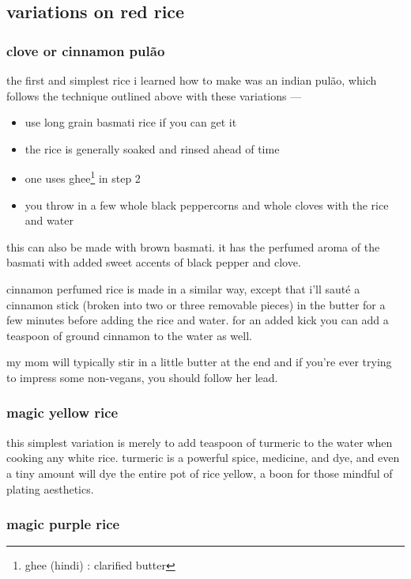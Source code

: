 \subsection{variations on red rice}

\subsubsection{clove or cinnamon pul\~{a}o}

the first and simplest rice i learned how to make was an indian
pul\~{a}o, which follows the technique outlined above with these
variations ---
\begin{itemize}
  \item use long grain basmati rice if you can get it

  \item the rice is generally soaked and rinsed ahead of time

  \item one uses ghee\footnote{ghee (hindi) : clarified butter} in
  step 2
  
  \item you throw in a few whole black peppercorns and whole cloves
  with the rice and water
\end{itemize}

this can also be made with brown basmati. it has the perfumed aroma of the basmati with added sweet accents of black pepper and clove.

cinnamon perfumed rice is made in a similar way, except that i'll
saut\'e a cinnamon stick (broken into two or three removable pieces)
in the butter for a few minutes before adding the rice and water. for
an added kick you can add a \onehalf teaspoon of ground cinnamon to the
water as well.

my mom will typically stir in a little butter at the end and if you're
ever trying to impress some non-vegans, you should follow her lead.

\subsubsection{magic yellow rice}

this simplest variation is merely to add \onehalf teaspoon of turmeric to
the water when cooking any white rice. turmeric is a powerful spice,
medicine, and dye, and even a tiny amount will dye the entire pot of
rice yellow, a boon for those mindful of plating aesthetics.

\subsubsection{magic purple rice}

